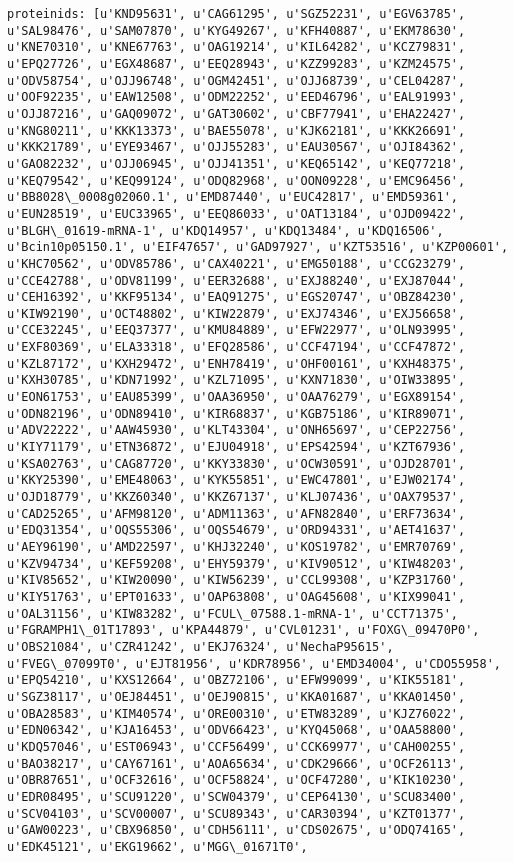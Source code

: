 \documentclass[11pt]{article}
\begin{document}
\begin{Verbatim}[commandchars=\\\{\}]
proteinids: [u'KND95631', u'CAG61295', u'SGZ52231', u'EGV63785', u'SAL98476', u'SAM07870', u'KYG49267', u'KFH40887', u'EKM78630', u'KNE70310', u'KNE67763', u'OAG19214', u'KIL64282', u'KCZ79831', u'EPQ27726', u'EGX48687', u'EEQ28943', u'KZZ99283', u'KZM24575', u'ODV58754', u'OJJ96748', u'OGM42451', u'OJJ68739', u'CEL04287', u'OOF92235', u'EAW12508', u'ODM22252', u'EED46796', u'EAL91993', u'OJJ87216', u'GAQ09072', u'GAT30602', u'CBF77941', u'EHA22427', u'KNG80211', u'KKK13373', u'BAE55078', u'KJK62181', u'KKK26691', u'KKK21789', u'EYE93467', u'OJJ55283', u'EAU30567', u'OJI84362', u'GAO82232', u'OJJ06945', u'OJJ41351', u'KEQ65142', u'KEQ77218', u'KEQ79542', u'KEQ99124', u'ODQ82968', u'OON09228', u'EMC96456', u'BB8028\_0008g02060.1', u'EMD87440', u'EUC42817', u'EMD59361', u'EUN28519', u'EUC33965', u'EEQ86033', u'OAT13184', u'OJD09422', u'BLGH\_01619-mRNA-1', u'KDQ14957', u'KDQ13484', u'KDQ16506', u'Bcin10p05150.1', u'EIF47657', u'GAD97927', u'KZT53516', u'KZP00601', u'KHC70562', u'ODV85786', u'CAX40221', u'EMG50188', u'CCG23279', u'CCE42788', u'ODV81199', u'EER32688', u'EXJ88240', u'EXJ87044', u'CEH16392', u'KKF95134', u'EAQ91275', u'EGS20747', u'OBZ84230', u'KIW92190', u'OCT48802', u'KIW22879', u'EXJ74346', u'EXJ56658', u'CCE32245', u'EEQ37377', u'KMU84889', u'EFW22977', u'OLN93995', u'EXF80369', u'ELA33318', u'EFQ28586', u'CCF47194', u'CCF47872', u'KZL87172', u'KXH29472', u'ENH78419', u'OHF00161', u'KXH48375', u'KXH30785', u'KDN71992', u'KZL71095', u'KXN71830', u'OIW33895', u'EON61753', u'EAU85399', u'OAA36950', u'OAA76279', u'EGX89154', u'ODN82196', u'ODN89410', u'KIR68837', u'KGB75186', u'KIR89071', u'ADV22222', u'AAW45930', u'KLT43304', u'ONH65697', u'CEP22756', u'KIY71179', u'ETN36872', u'EJU04918', u'EPS42594', u'KZT67936', u'KSA02763', u'CAG87720', u'KKY33830', u'OCW30591', u'OJD28701', u'KKY25390', u'EME48063', u'KYK55851', u'EWC47801', u'EJW02174', u'OJD18779', u'KKZ60340', u'KKZ67137', u'KLJ07436', u'OAX79537', u'CAD25265', u'AFM98120', u'ADM11363', u'AFN82840', u'ERF73634', u'EDQ31354', u'OQS55306', u'OQS54679', u'ORD94331', u'AET41637', u'AEY96190', u'AMD22597', u'KHJ32240', u'KOS19782', u'EMR70769', u'KZV94734', u'KEF59208', u'EHY59379', u'KIV90512', u'KIW48203', u'KIV85652', u'KIW20090', u'KIW56239', u'CCL99308', u'KZP31760', u'KIY51763', u'EPT01633', u'OAP63808', u'OAG45608', u'KIX99041', u'OAL31156', u'KIW83282', u'FCUL\_07588.1-mRNA-1', u'CCT71375', u'FGRAMPH1\_01T17893', u'KPA44879', u'CVL01231', u'FOXG\_09470P0', u'OBS21084', u'CZR41242', u'EKJ76324', u'NechaP95615', u'FVEG\_07099T0', u'EJT81956', u'KDR78956', u'EMD34004', u'CDO55958', u'EPQ54210', u'KXS12664', u'OBZ72106', u'EFW99099', u'KIK55181', u'SGZ38117', u'OEJ84451', u'OEJ90815', u'KKA01687', u'KKA01450', u'OBA28583', u'KIM40574', u'ORE00310', u'ETW83289', u'KJZ76022', u'EDN06342', u'KJA16453', u'ODV66423', u'KYQ45068', u'OAA58800', u'KDQ57046', u'EST06943', u'CCF56499', u'CCK69977', u'CAH00255', u'BAO38217', u'CAY67161', u'AOA65634', u'CDK29666', u'OCF26113', u'OBR87651', u'OCF32616', u'OCF58824', u'OCF47280', u'KIK10230', u'EDR08495', u'SCU91220', u'SCW04379', u'CEP64130', u'SCU83400', u'SCV04103', u'SCV00007', u'SCU89343', u'CAR30394', u'KZT01377', u'GAW00223', u'CBX96850', u'CDH56111', u'CDS02675', u'ODQ74165', u'EDK45121', u'EKG19662', u'MGG\_01671T0', 
\end{Verbatim}
\end{document}

